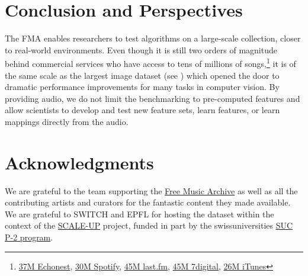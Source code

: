 \documentclass{article}
\begin{document}
\section{Conclusion and Perspectives}


The FMA enables researchers to test algorithms on a large-scale collection, closer to real-world environments. Even though it is still two orders of magnitude behind commercial services who have access to tens of millions of songs,\footnote{\href{http://the.echonest.com}{37M Echonest}, \href{https://en.wikipedia.org/wiki/Spotify}{30M Spotify}, \href{http://www.skilledtests.com/wiki/Last.fm_statistics}{45M last.fm}, \href{http://bupz.com/best-websites-to-buy-musics}{45M 7digital}, \href{https://www.apple.com/pr/library/2013/02/06iTunes-Store-Sets-New-Record-with-25-Billion-Songs-Sold.html}{26M iTunes}} it is of the same scale as the largest image dataset (see ) which opened the door to dramatic performance improvements for many tasks in computer vision.
By providing audio, we do not limit the benchmarking to pre-computed features and allow scientists to develop and test new feature sets, learn features, or learn mappings directly from the audio.



\section{Acknowledgments}


We are grateful to the team supporting the \href{https://freemusicarchive.org}{Free Music Archive} as well as all the contributing artists and curators for the fantastic content they made available.
We are grateful to SWITCH and EPFL for hosting the dataset within the context
of the \href{https://projects.switch.ch/scale-up}{SCALE-UP} project, funded in
part by the swissuniversities \href{http://www.swissuniversities.ch/isci}{SUC
P-2 program}.


\end{document}
